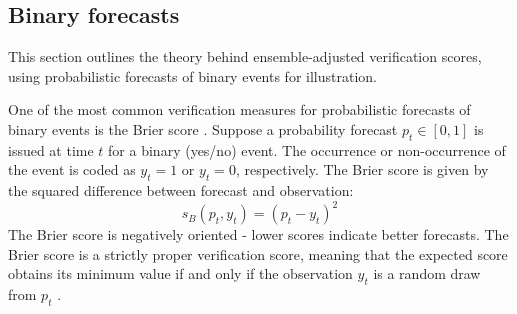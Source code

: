 \documentclass[article]{jss}\usepackage{graphicx, color}
\begin{document}
\subsection{Binary forecasts}

This section outlines the theory behind ensemble-adjusted verification scores, using probabilistic forecasts of binary events for illustration.  

One of the most common verification measures for probabilistic forecasts of binary events is the Brier score \citep{brier1950verification}.
Suppose a probability forecast $p_t \in [0,1]$ is issued at time $t$ for a binary (yes/no) event.
The occurrence or non-occurrence of the event is coded as $y_t=1$ or $y_t=0$, respectively. 
The Brier score is given by the squared difference between forecast and observation:
%
\begin{equation}
s_{B}(p_t, y_t) = (p_t - y_t)^2
\end{equation}
%
The Brier score is negatively oriented - lower scores indicate better forecasts.
The Brier score is a strictly proper verification score, meaning that the expected score obtains its minimum value if and only if the observation $y_t$ is a random draw from $p_t$ \citep{gneiting2007strictly}.
\end{document}
